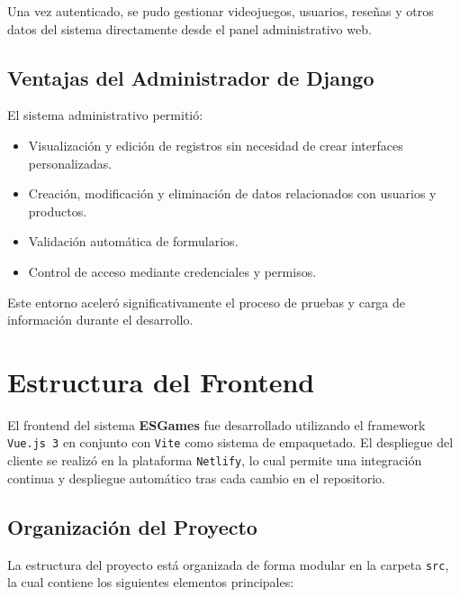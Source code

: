 \documentclass{article}
\begin{document}
Una vez autenticado, se pudo gestionar videojuegos, usuarios, reseñas y otros datos del sistema directamente desde el panel administrativo web.

\subsection{Ventajas del Administrador de Django}

El sistema administrativo permitió:

\begin{itemize}
  \item Visualización y edición de registros sin necesidad de crear interfaces personalizadas.
  \item Creación, modificación y eliminación de datos relacionados con usuarios y productos.
  \item Validación automática de formularios.
  \item Control de acceso mediante credenciales y permisos.
\end{itemize}

Este entorno aceleró significativamente el proceso de pruebas y carga de información durante el desarrollo.



\section{Estructura del Frontend}

El frontend del sistema \textbf{ESGames} fue desarrollado utilizando el framework \texttt{Vue.js 3} en conjunto con \texttt{Vite} como sistema de empaquetado. El despliegue del cliente se realizó en la plataforma \texttt{Netlify}, lo cual permite una integración continua y despliegue automático tras cada cambio en el repositorio.

\subsection{Organización del Proyecto}

La estructura del proyecto está organizada de forma modular en la carpeta \texttt{src}, la cual contiene los siguientes elementos principales:
\end{document}

